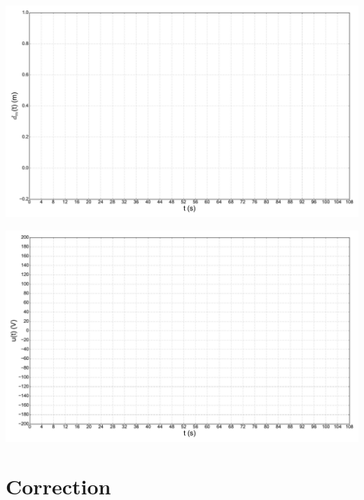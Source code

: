 \begin{center}
\includegraphics[width=0.95\linewidth]{img/deplacement}
\end{center}






\begin{center}
\includegraphics[width=0.95\linewidth]{img/tension}
\end{center}





\ifdef{\public}{}{}

\newpage
\cleardoublepage

\pagestyle{correction}

\section{Correction}

